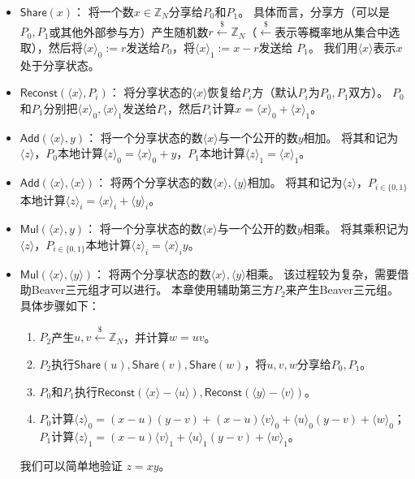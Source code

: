 \begin{itemize}
    \item $\mathsf{Share}(x)$：
    将一个数$x \in \mathbb Z_N$分享给$P_0$和$P_1$。
    具体而言，分享方（可以是$P_0, P_1$或其他外部参与方）产生随机数$r \stackrel{\$}{\gets} \mathbb Z_N$（$\stackrel{\$}{\gets}$表示等概率地从集合中选取），然后将$\langle x \rangle_0 := r$发送给$P_0$，将$\langle x \rangle_1 := x - r$发送给 $P_1$。
    我们用$\langle  x \rangle$表示$x$处于分享状态。

    \item $\mathsf{Reconst}(\langle x \rangle, P_i)$：
    将分享状态的$\langle x \rangle$恢复给$P_i$方（默认$P_i$为$P_0,P_1$双方）。
    $P_0$和$P_1$分别把$\langle x \rangle_0, \langle x \rangle_1$发送给$P_i$，然后$P_i$计算$x = \langle x \rangle_0 + \langle x \rangle_1$。

    \item $\mathsf{Add}(\langle x \rangle, y)$：
    将一个分享状态的数$\langle x \rangle$与一个公开的数$y$相加。
    将其和记为$\langle z \rangle$，$P_0$本地计算$\langle z \rangle_0 = \langle x \rangle_0 + y$，$P_1$本地计算$\langle z \rangle_1 = \langle x \rangle_1$。
    
    \item $\mathsf{Add}(\langle x \rangle, \langle x \rangle)$：
    将两个分享状态的数$\langle x \rangle, \langle y \rangle$相加。
    将其和记为$\langle z \rangle$，$P_{i\in \{0, 1\}}$本地计算$\langle z\rangle_i = \langle x \rangle_i + \langle y \rangle_i$。
    
    \item $\mathsf{Mul}(\langle x \rangle, y)$：
    将一个分享状态的数$\langle x \rangle$与一个公开的数$y$相乘。
    将其乘积记为$\langle z \rangle$，$P_{i\in \{0, 1\}}$本地计算$\langle z\rangle_i = \langle x \rangle_i y$。

    \item $\mathsf{Mul}(\langle x \rangle, \langle y \rangle)$：
    将两个分享状态的数$\langle x \rangle, \langle y \rangle$相乘。
    该过程较为复杂，需要借助Beaver三元组才可以进行。
    本章使用辅助第三方$P_2$来产生Beaver三元组。
    具体步骤如下：
    \begin{enumerate}
        \item $P_2$产生$u, v\stackrel{\$}{\gets} \mathbb Z_N$，并计算$w = uv$。
        
        \item $P_2$执行$\mathsf{Share}(u), \mathsf{Share}(v), \mathsf{Share}(w)$，将$u, v, w$分享给$P_0, P_1$。
        
        \item $P_0$和$P_1$执行$\mathsf{Reconst}(\langle x \rangle - \langle u \rangle), \mathsf{Reconst}(\langle y \rangle - \langle v \rangle)$。

        \item $P_0$计算$\langle  z \rangle_0 = (x - u)(y - v) + (x - u)\langle v \rangle_0 + \langle u \rangle_0 (y - v) + \langle w \rangle_0$；$P_1$计算$\langle  z \rangle_1 = (x - u)\langle v \rangle_1 + \langle u \rangle_1 (y - v) + \langle w \rangle_1$。
    \end{enumerate}
    我们可以简单地验证 $z = xy$。
\end{itemize}

